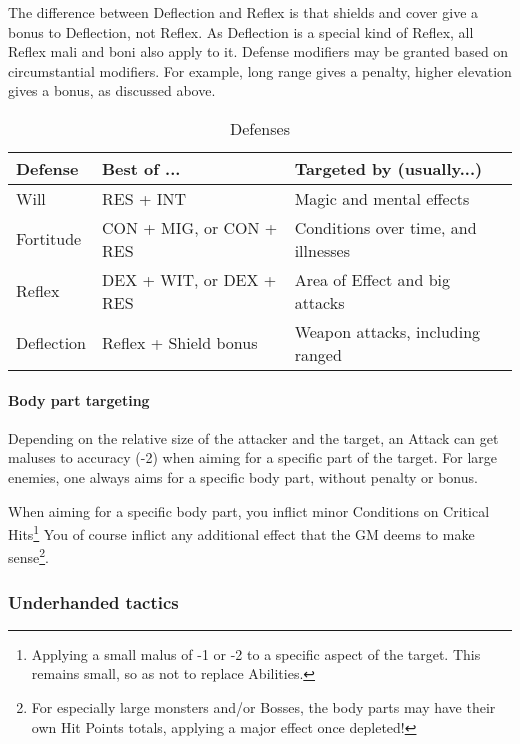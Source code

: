 The difference between Deflection and Reflex is that shields and cover give a bonus to Deflection, not Reflex. As Deflection is a special kind of Reflex, all Reflex mali and boni also apply to it. Defense modifiers may be granted based on circumstantial modifiers. For example, long range gives a penalty, higher elevation gives a bonus, as discussed above.

\begin{table*}[h!tbp]
	\begin{center}
		\begin{tabular}{p{2cm}p{5cm}p{7cm}} \toprule
			
		    \textbf{Defense} & \textbf{Best of ...} & \textbf{Targeted by (usually...)} \\ \midrule

		    Will & RES + INT & Magic and mental effects \\
		    Fortitude & CON + MIG, or CON + RES & Conditions over time, and illnesses \\
		    Reflex & DEX + WIT, or DEX + RES & Area of Effect and big attacks \\
		    Deflection & Reflex + Shield bonus & Weapon attacks, including ranged \\

		    \bottomrule
		\end{tabular}
	\end{center}
	\caption{Defenses}
  \label{defenses_table}
\end{table*}


\paragraph{Body part targeting} 

Depending on the relative size of the attacker and the target, an Attack can get maluses to accuracy (-2) when aiming for a specific part of the target. For large enemies, one always aims for a specific body part, without penalty or bonus.

When aiming for a specific body part, you inflict minor Conditions on Critical Hits\footnote{Applying a small malus of -1 or -2 to a specific aspect of the target. This remains small, so as not to replace Abilities.} You of course inflict any additional effect that the GM deems to make sense\footnote{For especially large monsters and/or Bosses, the body parts may have their own Hit Points totals, applying a major effect once depleted!}.

\subsubsection{Underhanded tactics} 

